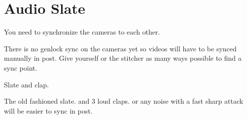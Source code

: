 \chapter{Audio Slate}
\pagecolor{white}
\label{chap:22}
\begin{fullwidth}


\problem

{\large You need to synchronize the cameras to each other. 

 \par}

There is no genlock sync on the cameras yet so videos will have to be synced manually in post. Give yourself or the stitcher as many ways possible to find a sync point. 

\solution

{\large Slate and clap.

 \par}

The old fashioned slate. and 3 loud claps. or any noise with a fast sharp attack will be easier to sync in post. 


\clearpage
\end{fullwidth}
